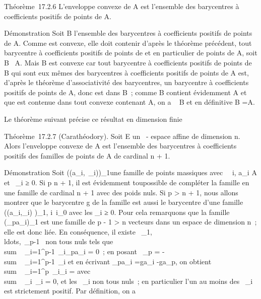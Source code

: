 \documentclass[]{article}
\begin{document}
Théorème~17.2.6 L'enveloppe convexe \hatA de A est
l'ensemble des barycentres à coefficients positifs de points de A.

Démonstration Soit B l'ensemble des barycentres à coefficients positifs
de points de A. Comme \hatA est convexe, elle doit
contenir d'après le théorème précédent, tout barycentre à coefficients
positifs de points de \hatA et en particulier de
points de A, soit B \subset~\hat A. Mais B est convexe car
tout barycentre à coefficients positifs de points de B qui sont eux
mêmes des barycentres à coefficients positifs de points de A est,
d'après le théorème d'associativité des barycentres, un barycentre à
coefficients positifs de points de A, donc est dans B~; comme B contient
évidemment A et que \hatA est contenue dans tout
convexe contenant A, on a \hatA \subset~ B et en définitive
B =\hat A.

Le théorème suivant précise ce résultat en dimension finie

Théorème~17.2.7 (Carathéodory). Soit E un ~- espace affine de dimension
n. Alors l'enveloppe convexe \hatA de A est
l'ensemble des barycentres à coefficients positifs des familles de
points de A de cardinal n + 1.

Démonstration Soit \left
((a\_i,\lambda~\_i)\right )\_1\leqi\leqp une
famille de points massiques avec \forall~~i,
a\_i \in A et \lambda~\_i ≥ 0. Si p \leq n + 1, il est évidemment
tou\jmathours possible de compléter la famille en une famille de cardinal n +
1 avec des poids nuls. Si p \textgreater{} n + 1, nous allons montrer
que le barycentre g de la famille est aussi le barycentre d'une famille
\left ((a\_i,\mu\_i)\right
)\_1\leqi\leqp, i\neq~i\_0 avec les
\mu\_i ≥ 0. Pour cela remarquons que la famille
(\overrightarrowa\_pa\_i)\_1\leqi{}
est une famille de p - 1 \textgreater{} n vecteurs dans un espace de
dimension n~; elle est donc liée. En conséquence, il existe
\alpha~\_1,\\ldots,\alpha~\_p-1~
non tous nuls tels que
\\sum ~
\_i=1^p-1\alpha~\_i\overrightarrowa\_pa\_i
= 0~; en posant \alpha~\_p =
-\\sum ~
\_i=1^p-1\alpha~\_i et en écrivant
\overrightarrowa\_pa\_i
=\overrightarrow ga\_i
-\overrightarrow ga\_p, on obtient
\\sum ~
\_i=1^p\alpha~\_i\overrightarrowga\_i
= avec
\\sum ~
\_i\alpha~\_i = 0, et les \alpha~\_i non tous nuls~; en
particulier l'un au moins des \alpha~\_i est strictement positif. Par
définition, on a \\\sum
\end{document}
